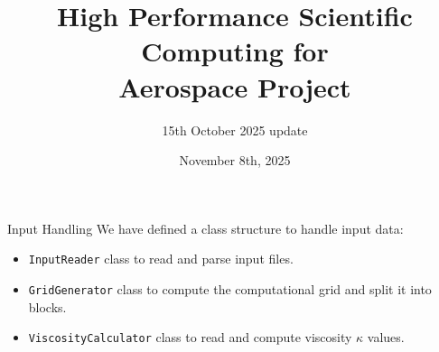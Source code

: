 \documentclass{beamer}
\title{High Performance Scientific Computing for \\ Aerospace Project}
\subtitle{15th October 2025 update}
\date{November 8th, 2025}
\begin{document}
\begin{frame}
    \maketitle
\end{frame}


\begin{frame}{Input Handling}
    We have defined a class structure to handle input data:
    \begin{itemize}
        \item \texttt{InputReader} class to read and parse input files.
        \item \texttt{GridGenerator} class to compute the computational grid and split it into blocks.
        \item \texttt{ViscosityCalculator} class to read and compute viscosity $\kappa$ values.
    \end{itemize}
    

\end{frame}
\end{document}

